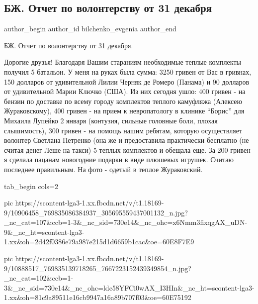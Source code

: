  
 
 
 
 
 
\subsection{БЖ. Отчет по волонтерству от 31 декабря}
\label{sec:31_12_2014.fb.bilchenko_evgenia.1.otchet_volonterstvo}
\ifcmt
 author_begin
   author_id bilchenko_evgenia
 author_end
\fi


БЖ. Отчет по волонтерству от 31 декабря. 

Дорогие друзья! Благодаря Вашим стараниям необходимые теплые комплекты получил
5 батальон. У меня на руках была сумма: 3250 гривен от Вас в гривнах, 150
долларов от удивительной Лилии Черняк де Ромеро (Панама) и 90 долларов от
удивительной Марии Ключко (США). Из них сегодня ушло: 400 гривен - на бензин по
доставке по всему городу комплектов теплого камуфляжа (Алексею Жураковскому),
400 гривен - на прием к невропатологу в клинике \enquote{Борис} для Михаила Лупейко 2
января (контузия, сильные головные боли, плохая слышимость), 300 гривен - на
помощь нашим ребятам, которую осуществляет волонтер Светлана Петренко (она же и
предоставила практически бесплатно (не считая денег Леше на такси) 5 теплых
комплектов и обещала еще. За 200 гривен я сделала пацанам новогодние подарки в
виде плюшевых игрушек. Считаю последнее правильным. На фото - одетый в теплое
Жураковский.


\ifcmt
  tab_begin cols=2

     pic https://scontent-lga3-1.xx.fbcdn.net/v/t1.18169-9/10906458_769835086384937_305695559437001132_n.jpg?_nc_cat=107&ccb=1-3&_nc_sid=730e14&_nc_ohc=x6Nmm3fixqgAX_uDN-9&_nc_ht=scontent-lga3-1.xx&oh=2d42f0386e79a987e215d1d6659b1cac&oe=60E8F7E9

     pic https://scontent-lga3-1.xx.fbcdn.net/v/t1.18169-9/10888517_769835139718265_7667223152439349854_n.jpg?_nc_cat=102&ccb=1-3&_nc_sid=730e14&_nc_ohc=ldc58YFCi0wAX_I3HIn&_nc_ht=scontent-lga3-1.xx&oh=81c9a89511e16cb9947a16a89b707f03&oe=60E75192

